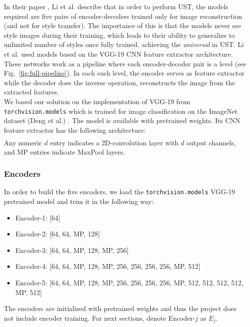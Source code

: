 \hspace{0.5cm} In their paper \cite{bib11}, Li et al. describe that in order to perform UST, the models required are five pairs of encoder-decoders trained only for image reconstruction (and not for style transfer). The importance of this is that the models never see style images during their training, which leads to their ability to generalize to unlimited number of styles once fully trained, achieving the \textit{universal} in UST. Li et al. used models based on the VGG-19 CNN feature extractor architecture. These networks work as a pipeline where each encoder-decoder pair is a level (see Fig.~\ref{fig:full-pipeline}). In each such level, the encoder serves as feature extractor while the decoder does the inverse operation, reconstructs the image from the extracted features.\\
We based our solution on the implementation of VGG-19 \cite{bib20} from \texttt{torchvision.models} which is trained for image classification on the ImageNet dataset (Deng et al.) \cite{bib21}. The model is available with pretrained weights. Its CNN feature extractor has the following architecture:
\begin{gather*}
[64, 64, MP, 128, 128, MP, 256, 256, 256, 256, MP, 512, 512, 512, 512, MP, 512, 512, 512, 512, MP]
\end{gather*}
Any numeric $d$ entry indicates a 2D-convolution layer with $d$ output channels, and MP entries indicate MaxPool layers.

\subsubsection{Encoders}\label{subsec:Encoders}
In order to build the five encoders, we load the \texttt{torchvision.models} VGG-19 pretrained model and trim it in the following way:
\begin{itemize}
	\item Encoder-1: [64]
	\item Encoder-2: [64, 64, MP, 128]
	\item Encoder-3: [64, 64, MP, 128, MP, 256]
	\item Encoder-4: [64, 64, MP, 128, MP, 256, 256, 256, 256, MP, 512]
	\item Encoder-5: [64, 64, MP, 128, MP, 256, 256, 256, 256, MP, 512, 512, 512, 512, MP, 512]
\end{itemize}
The encoders are initialized with pretrained weights and thus the project does not include encoder training. For next sections, denote Encoder-$j$ as $E_j$.

